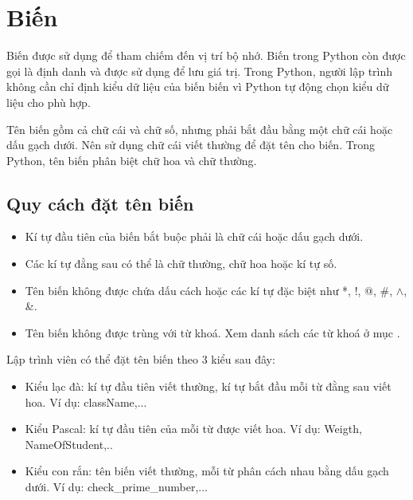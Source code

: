 \section{Biến}
Biến được sử dụng để tham chiếm đến vị trí bộ nhớ. Biến trong Python còn được gọi là định danh và được sử dụng để lưu giá trị. Trong Python, người lập trình không cần chỉ định kiểu dữ liệu của biến biến vì Python tự động chọn kiểu dữ liệu cho phù hợp.\par
Tên biến gồm cả chữ cái và chữ số, nhưng phải bắt đầu bằng một chữ cái hoặc dấu gạch dưới. Nên sử dụng chữ cái viết thường để đặt tên cho biến. Trong Python, tên biến phân biệt chữ hoa và chữ thường.\par
\subsection{Quy cách đặt tên biến}
\begin{itemize}
	\itemsep\setlength{0em}
	\item Kí tự đầu tiên của biến bắt buộc phải là chữ cái hoặc dấu gạch dưới.
	\item Các kí tự đằng sau có thể là chữ thường, chữ hoa hoặc kí tự số.
	\item Tên biến không được chứa dấu cách hoặc các kí tự đặc biệt như *, !, @, \#, $\wedge$, \&.
	\item Tên biến không được trùng với từ khoá. Xem danh sách các từ khoá ở mục .
\end{itemize}
Lập trình viên có thể đặt tên biến theo 3 kiểu sau đây:
\begin{itemize}
	\itemsep\setlength{0em}
	\item Kiểu lạc đà: kí tự đầu tiên viết thường, kí tự bắt đầu mỗi từ đằng sau viết hoa. Ví dụ: className,...
	\item Kiểu Pascal: kí tự đầu tiên của mỗi từ được viết hoa. Ví dụ: Weigth, NameOfStudent,..
	\item Kiểu con rắn:	tên biến viết thường, mỗi từ phân cách nhau bằng dấu gạch dưới. Ví dụ: check\_prime\_number,...
\end{itemize}
